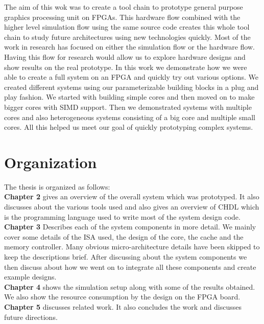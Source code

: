 The aim of this wok was to create a tool chain to prototype general purpose graphics processing unit on FPGAs. This hardware flow combined with the higher level simulation flow using the same source code creates this whole tool chain to study future architectures using new technologies quickly. Most of the work in research has focused on either the simulation flow or the hardware flow. Having this flow for research would allow us to explore hardware designs and show results on the real prototype. %
In this work we demonstrate how we were able to create a full system on an FPGA and quickly try out various options. We created different systems using our parameterizable building blocks in a plug and play fashion. We started with building simple cores and then moved on to make bigger cores with SIMD support. Then we demonstrated systems with multiple cores and also heterogeneous systems consisting of a big core and multiple small cores. All this helped us meet our goal of quickly prototyping complex systems.

\section{Organization}
The thesis is organized as follows:
\\ 
\noindent\textbf{Chapter 2} gives an overview of the overall system which was prototyped. It also discusses about the various tools used and also gives an overview of CHDL which is the programming language used to write most of the system design code.
\\
\noindent\textbf{Chapter 3} Describes each of the system components in more detail. We mainly cover some details of the ISA used, the design of the core, the cache and the memory controller. Many obvious micro-architecture details have been skipped to keep the descriptions brief. After discussing about the system components we then discuss about how we went on to integrate all these components and create example designs.
\\
\noindent\textbf{Chapter 4} shows the simulation setup along with some of the results obtained. We also show the resource consumption by the design on the FPGA board.
\\
\noindent\textbf{Chapter 5} discusses related work. It also concludes the work and discusses future directions. 

